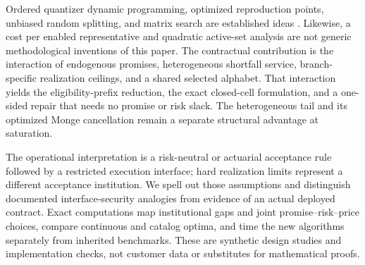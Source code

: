 Ordered quantizer dynamic programming, optimized reproduction points, unbiased random splitting, and matrix search are established ideas \citep{Wu1991,PagesWilbertz2012,CrociEtAl2022,JourdainPages2021}. Likewise, a cost per enabled representative and quadratic active-set analysis are not generic methodological inventions of this paper. The contractual contribution is the interaction of endogenous promises, heterogeneous shortfall service, branch-specific realization ceilings, and a shared selected alphabet. That interaction yields the eligibility-prefix reduction, the exact closed-cell formulation, and a one-sided repair that needs no promise or risk slack. The heterogeneous tail and its optimized Monge cancellation remain a separate structural advantage at saturation.

The operational interpretation is a risk-neutral or actuarial acceptance rule followed by a restricted execution interface; hard realization limits represent a different acceptance institution. We spell out those assumptions and distinguish documented interface-security analogies from evidence of an actual deployed contract. Exact computations map institutional gaps and joint promise--risk--price choices, compare continuous and catalog optima, and time the new algorithms separately from inherited benchmarks. These are synthetic design studies and implementation checks, not customer data or substitutes for mathematical proofs.
